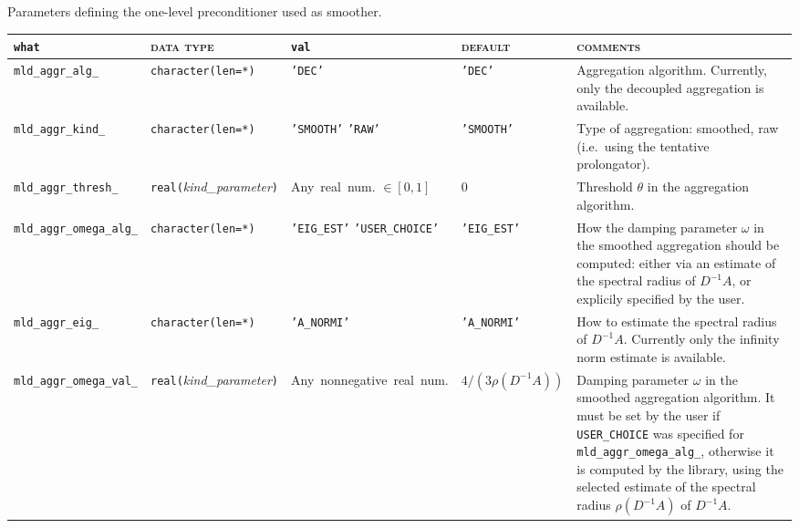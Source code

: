 \caption{Parameters defining the one-level preconditioner used as smoother.
\label{tab:p_smoother}}  
\esideways
                   
\bsideways
\begin{center}
\begin{tabular}{|l|l|p{2.4cm}|p{2.4cm}|p{7cm}|}
\hline
\verb|what|              & \textsc{data type}        &  \verb|val|      &  \textsc{default}  &
\textsc{comments} \\ \hline
\verb|mld_aggr_alg_|     & \verb|character(len=*)|
                         & \texttt{'DEC'}
                         & \texttt{'DEC'}
                         & Aggregation algorithm. Currently, only the decoupled aggregation is available. \\ \hline
\verb|mld_aggr_kind_|    & \verb|character(len=*)|
                         & \texttt{'SMOOTH'} \hspace{2.5cm} \texttt{'RAW'}
                         & \texttt{'SMOOTH'}
                         & Type of aggregation: smoothed, raw (i.e.\ using the tentative prolongator). \\ \hline
\verb|mld_aggr_thresh_|  & \verb|real(|\emph{kind\_parameter}\verb|)|
                         & Any~real~num. $\in [0, 1]$
                         & 0
                         & Threshold $\theta$ in the aggregation algorithm. \\ \hline
\verb|mld_aggr_omega_alg_| & \verb|character(len=*)|
                         & \texttt{'EIG\_EST'} \hspace{2.5cm} \texttt{'USER\_CHOICE'}
                         & \texttt{'EIG\_EST'}
                         & How the damping parameter $\omega$ in the
                         smoothed aggregation should be computed:
                         either via an estimate of the spectral radius of
                         $D^{-1}A$, or explicily
                         specified by the user. \\ \hline
\verb|mld_aggr_eig_|     & \verb|character(len=*)|
                         & \texttt{'A\_NORMI'}
                         & \texttt{'A\_NORMI'}
                         & How to estimate the spectral radius of $D^{-1}A$.
                           Currently only the infinity norm estimate
                           is available. \\ \hline
\verb|mld_aggr_omega_val_|    & \verb|real(|\emph{kind\_parameter}\verb|)|
                         & Any~nonnegative~real~num.
                         & $4/(3\rho(D^{-1}A))$
                         & Damping parameter $\omega$ in the smoothed aggregation algorithm. 
                           It must be set by the user if
                           \verb|USER_CHOICE| was specified for 
                           \verb|mld_aggr_omega_alg_|,
                           otherwise it is computed by the library, using the
                           selected estimate of the spectral radius $\rho(D^{-1}A)$ of
                           $D^{-1}A$.\\
\hline
\end{tabular}
\end{center}
